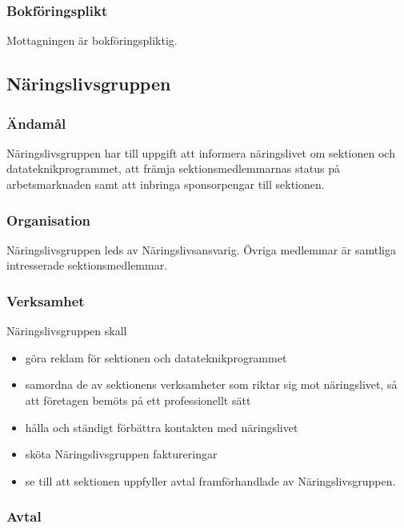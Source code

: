 \documentclass{dgovdoc}
\begin{document}
\subsubsection{Bokföringsplikt}

Mottagningen är bokföringspliktig.

\subsection{Näringslivsgruppen}

\subsubsection{Ändamål}

Näringslivsgruppen har till uppgift att informera näringslivet om sektionen och
datateknikprogrammet, att främja sektionsmedlemmarnas status på arbetsmarknaden
samt att inbringa sponsorpengar till sektionen.

\subsubsection{Organisation}

Näringslivsgruppen leds av Näringslivsansvarig. Övriga medlemmar är samtliga
intresserade sektionsmedlemmar.

\subsubsection{Verksamhet}

Näringslivsgruppen skall

\begin{itemize}
  \item göra reklam för sektionen och datateknikprogrammet
  \item samordna de av sektionens verksamheter som riktar sig mot näringslivet,
    så att företagen bemöts på ett professionellt sätt
  \item hålla och ständigt förbättra kontakten med näringslivet
  \item sköta Näringslivsgruppen faktureringar
  \item se till att sektionen uppfyller avtal framförhandlade av
    Näringslivsgruppen.
\end{itemize}

\subsubsection{Avtal}
\end{document}
